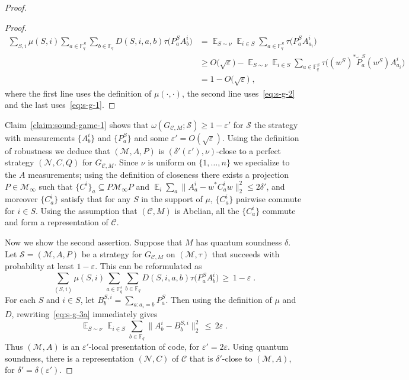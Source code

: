 \documentclass[11pt]{article}
\theoremstyle{definition}
\newcommand{\code}{\mathcal{C}}
\newcommand{\strategy}{\mathscr{S}}
\DeclareMathOperator*{\Expectation}{\mathbb{E}}
\newcommand{\Es}[1]{\Expectation_{#1}}
\newcommand{\F}{\ensuremath{\mathbb{F}}}
\newcommand{\mM}{\ensuremath{\mathcal{M}}}
\newcommand{\eps}{\varepsilon}
\newcommand{\mN}{\mathcal{N}}
\begin{document}
\begin{proof}
\begin{proof}
\begin{align*}
 \sum_{S,i} \mu(S,i) \sum_{a\in \F^S_q}\sum_{b\in\F_q} D(S,i,a,b) \tau\big(  P^S_a  A^i_{b}\big)
&=  \Es{S\sim\nu} \Es{i\in S} \sum_{a\in \F^S_q}  \tau\big(  P^S_a  A^i_{a_i}\big)\\
&\geq O\big(\sqrt{\eps}\big) - \Es{S\sim \nu} \Es{i\in S} \sum_{a\in \F_q^S} \tau\big( (w^S)^* \tilde{P}^S_a (w^S)A^i_{a_i}\big)\\
&= 1-O\big(\sqrt{\eps}\big)\;,
\end{align*}
where the first line uses the definition of $\mu(\cdot,\cdot)$, the second line uses~\eqref{eq:s-g-2} and the last uses~\eqref{eq:s-g-1}. 
\end{proof}

Claim~\ref{claim:sound-game-1} shows that $\omega(G_{\code,M};\strategy)\geq 1-\eps'$ for $\strategy$ the strategy with measurements $\{A^i_b\}$ and $\{P^{S}_a\}$ and some $\eps'=O(\sqrt{\eps})$. Using the definition of robustness we deduce that $(\mM,A,P)$  is $(\delta'(\eps'),\nu)$-close to a perfect strategy $(\mN,C,Q)$  for $G_{\code,M}$. Since $\nu$ is uniform on $\{1,\ldots,n\}$ we specialize to the $A$ measurements; using the definition of closeness there exists a projection $P\in \mM_\infty$ such that $\{C^i\}_a \subseteq P\mM_\infty P$ and $\Es{i}\sum_a \|A^i_a-w^* C^i_a w \|_2^2 \leq 2\delta'$, and moreover $\{C^i_a\}$ satisfy that for any $S$ in the support of $\mu$, $\{C^i_a\}$ pairwise commute for $i\in S$. Using the assumption that $(\code,M)$ is Abelian, all the $\{C^i_a\}$ commute and form a representation of $\code$.

Now we show the second assertion. Suppose that $M$ has quantum soundness $\delta$.
Let $\strategy=(\mM,A,P)$ be a strategy for $G_{\code,M}$ on $(\mM,\tau)$ that succeeds with probability at least $1-\eps$. This can be reformulated as 
\begin{equation}
 \sum_{(S,i)} \mu(S,i) \sum_{a\in \F_q^s}\sum_{b\in\F_q} D(S,i,a,b) \tau\big(  P^S_a  A^i_{b}\big) \,\geq \,1-\eps\;.\label{eq:s-g-3a}
\end{equation}
For each $S$ and $i\in S$, let $B^{S,i}_b = \sum_{a:a_i=b} P^S_a$. Then using the definition of $\mu$ and $D$, rewriting~\eqref{eq:s-g-3a} immediately gives
\begin{equation}
 \Es{S\sim \nu} \Es{i\in S} \sum_{b\in\F_q} \big\| A^i_{b} - B^{S,i}_b\big\|_2^2 \,\leq \,2\eps\;.\label{eq:s-g-3}
\end{equation}
Thus $(\mM,A)$ is an $\eps'$-local presentation of code, for $\eps'=2\eps$. Using quantum soundness, there is a representation $(\mN,C)$ of $\code$ that is $\delta'$-close to $(\mM,A)$, for $\delta'=\delta(\eps')$. 


\end{proof}
\end{document}

